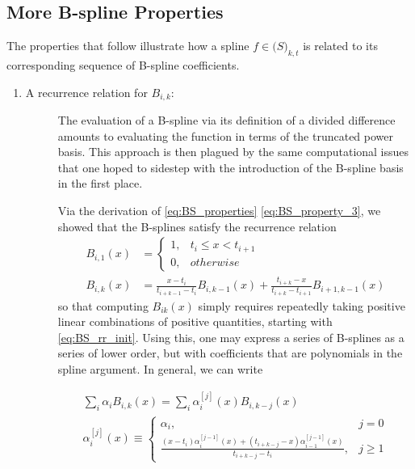 \documentclass[12pt]{article}
\theoremstyle{definition}
\begin{document}
\subsection{More B-spline Properties} \label{BS_properties_continued}

The properties that follow illustrate how a spline $f \in \mathscr(S)_{k,t}$ is related to its corresponding sequence of B-spline coefficients.

\begin{enumerate} \label{eq:more_BS_properties}
\setcounter{enumi}{3}
\item \begin{description}\item[A recurrence relation for $B_{i,k}$:] The evaluation of a B-spline via its definition of a divided difference amounts to evaluating the function in terms of the truncated power basis. This approach is then plagued by the same computational issues that one hoped to sidestep with the introduction of the B-spline basis in the first place. 

Via the derivation of \ref{eq:BS_properties} \ref{eq:BS_property_3}, we showed that the B-splines satisfy the recurrence relation
\begin{align}
B_{i,1}\left(x\right) &= \left\{ \begin{array}{ll} \label{eq:BS_rr_init}
1, & t_i \le x < t_{i+1}\\
0, & otherwise
\end{array} \right.
\\
B_{i,k}\left(x\right) &= \frac{x-t_i}{t_{i+k-1}-t_i}B_{i,k-1}\left(x\right) + \frac{t_{i+k}-x}{t_{i+k}-t_{i+1}}B_{i+1,k-1}\left(x\right)   \label{eq:BS_rr}
\end{align}
so that computing $B_{ik}\left(x\right)$ simply requires repeatedly taking positive linear combinations of positive quantities, starting with \ref{eq:BS_rr_init}. Using this, one may express a series of B-splines as a series of lower order, but with coefficients that are polynomials in the spline argument. In general, we can write

\begin{subequations} 
\begin{align}
\sum_{i}\alpha_i B_{i,k}\left(x\right) = \sum_{i}\alpha_i^{\left[j \right]}\left(x\right) B_{i,k-j}\left(x\right) \label{eq:BS_rr_general_a}\\
\alpha_i^{\left[j\right]}\left(x\right) \equiv \left\{ \begin{array}{cl} \alpha_i, & j = 0 \\
						\frac{\left(x-t_i\right)\alpha_i^{\left[j-1\right]}\left(x\right) + \left(t_{i+k-j}-x\right)\alpha_{i-1}^{\left[j-1\right]}\left(x\right) }{t_{i+k-j}-t_{i}}, & j \ge 1  
						\end{array} \right.
						\label{eq:BS_rr_general_b}
\end{align}
\end{subequations} 


\end{description}
\end{enumerate}
\end{document}
